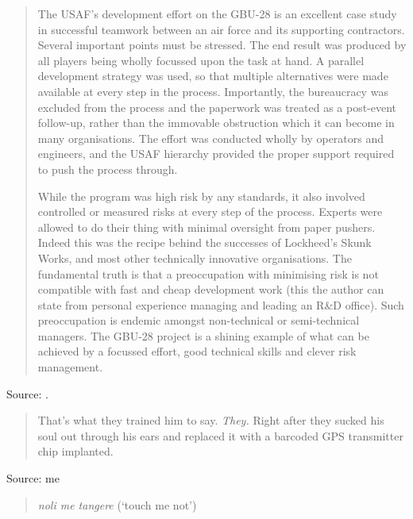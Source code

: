 \documentclass[a4paper]{article}
\begin{document}
\begin{quotation}
	The USAF's development effort on the GBU-28 is an excellent
	case study in successful teamwork between an air force and
	its supporting contractors. Several important points must be
	stressed. The end result was produced by all players being wholly
	focussed upon the task at hand. A parallel development strategy
	was used, so that multiple alternatives were made available at
	every step in the process. Importantly, the bureaucracy was
	excluded from the process and the paperwork was treated as a
	post-event follow-up, rather than the immovable obstruction which
	it can become in many organisations. The effort was conducted
	wholly by operators and engineers, and the USAF hierarchy provided
	the proper support required to push the process through.

	While the program was high risk by any standards, it also involved
	controlled or measured risks at every step of the process. Experts
	were allowed to do their thing with minimal oversight from
	paper pushers. Indeed this was the recipe behind the successes
	of Lockheed's Skunk Works, and most other technically innovative
	organisations. The fundamental truth is that a preoccupation with
	minimising risk is not compatible with fast and cheap development
	work (this the author can state from personal experience managing
	and leading an R\&D office). Such preoccupation is endemic amongst
	non-technical or semi-technical managers. The GBU-28 project is
	a shining example of what can be achieved by a focussed effort,
	good technical skills and clever risk management.
\end{quotation}
Source: \citet{Kopp2011a}.
\medskip

\begin{quote}
	That's what they trained him to say.  \emph{They.}  Right after
they sucked his soul out through his ears and replaced it with a
barcoded GPS transmitter chip implanted.
\end{quote}
Source: me
\medskip

\begin{quote}
	{\it noli me tangere} (`touch me not')
\end{quote}
\medskip
\end{document}
